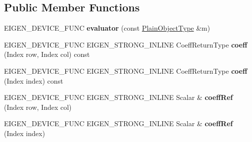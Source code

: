 \subsection*{Public Member Functions}
\begin{DoxyCompactItemize}
\item 
\mbox{\label{struct_eigen_1_1internal_1_1evaluator_3_01_plain_object_base_3_01_derived_01_4_01_4_a39ce58da2063ef56c2e8c232edd6dbb2}} 
E\+I\+G\+E\+N\+\_\+\+D\+E\+V\+I\+C\+E\+\_\+\+F\+U\+NC {\bfseries evaluator} (const \mbox{\hyperlink{class_eigen_1_1_plain_object_base}{Plain\+Object\+Type}} \&m)
\item 
\mbox{\label{struct_eigen_1_1internal_1_1evaluator_3_01_plain_object_base_3_01_derived_01_4_01_4_a4d48e48a68b15c30177dd495409e95c3}} 
E\+I\+G\+E\+N\+\_\+\+D\+E\+V\+I\+C\+E\+\_\+\+F\+U\+NC E\+I\+G\+E\+N\+\_\+\+S\+T\+R\+O\+N\+G\+\_\+\+I\+N\+L\+I\+NE Coeff\+Return\+Type {\bfseries coeff} (Index row, Index col) const
\item 
\mbox{\label{struct_eigen_1_1internal_1_1evaluator_3_01_plain_object_base_3_01_derived_01_4_01_4_aaa358a51466994e46c685ce03bd0ab3c}} 
E\+I\+G\+E\+N\+\_\+\+D\+E\+V\+I\+C\+E\+\_\+\+F\+U\+NC E\+I\+G\+E\+N\+\_\+\+S\+T\+R\+O\+N\+G\+\_\+\+I\+N\+L\+I\+NE Coeff\+Return\+Type {\bfseries coeff} (Index index) const
\item 
\mbox{\label{struct_eigen_1_1internal_1_1evaluator_3_01_plain_object_base_3_01_derived_01_4_01_4_a80c4c10d826dce2a6db0661d82c8edb4}} 
E\+I\+G\+E\+N\+\_\+\+D\+E\+V\+I\+C\+E\+\_\+\+F\+U\+NC E\+I\+G\+E\+N\+\_\+\+S\+T\+R\+O\+N\+G\+\_\+\+I\+N\+L\+I\+NE Scalar \& {\bfseries coeff\+Ref} (Index row, Index col)
\item 
\mbox{\label{struct_eigen_1_1internal_1_1evaluator_3_01_plain_object_base_3_01_derived_01_4_01_4_a1704a0c9fee5e1632a3472f7b321d157}} 
E\+I\+G\+E\+N\+\_\+\+D\+E\+V\+I\+C\+E\+\_\+\+F\+U\+NC E\+I\+G\+E\+N\+\_\+\+S\+T\+R\+O\+N\+G\+\_\+\+I\+N\+L\+I\+NE Scalar \& {\bfseries coeff\+Ref} (Index index)

\end{DoxyCompactItemize}
